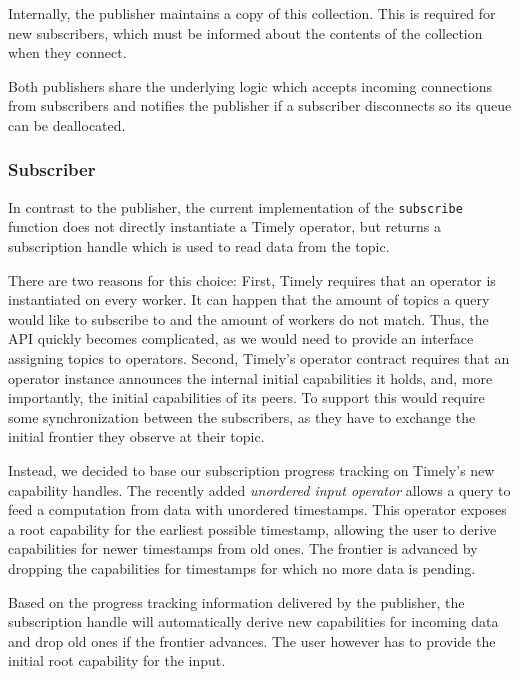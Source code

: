 Internally, the publisher maintains a copy of this collection. This is required
for new subscribers, which must be informed about the contents of the collection
when they connect. 

Both publishers share the underlying logic which accepts incoming connections
from subscribers and notifies the publisher if a subscriber disconnects so
its queue can be deallocated.

\subsubsection{Subscriber}

In contrast to the publisher, the current implementation of the \lstinline{subscribe}
function does not directly instantiate a Timely operator, but returns a subscription
handle which is used to read data from the topic.

There are two reasons for this choice: First, Timely requires that an operator
is instantiated on every worker. It can happen that the amount of topics a query
would like to subscribe to and the amount of workers do not match. Thus, the API
quickly becomes complicated, as we would need to provide an interface assigning
topics to operators.
Second, Timely's operator contract requires that an operator instance announces
the internal initial capabilities it holds, and, more importantly, the initial
capabilities of its peers. To support this would require some synchronization
between the subscribers, as they have to exchange the initial frontier they
observe at their topic.

Instead, we decided to base our subscription progress tracking on Timely's new
capability handles. The recently added \emph{unordered input operator} allows
a query to feed a computation from data with unordered timestamps. This operator
exposes a root capability for the earliest possible timestamp, allowing the user
to derive capabilities for newer timestamps from old ones. The frontier
is advanced by dropping the capabilities for timestamps for which no more data
is pending.

Based on the progress tracking information delivered by the publisher, the
subscription handle will automatically derive new capabilities for incoming
data and drop old ones if the frontier advances. The user however has to
provide the initial root capability for the input.

